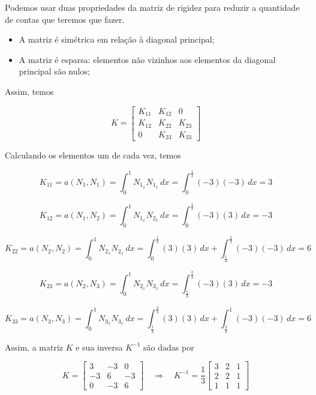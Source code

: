 \documentclass[12pt]{scrartcl}
\newcommand{\logo}{\quad \Rightarrow \quad}
\begin{document}
Podemos usar duas propriedades da matriz de rigidez para reduzir a quantidade de contas que teremos que fazer.
\begin{itemize}
    \item A matriz é simétrica em relação à diagonal principal;
    \item A matriz é esparsa: elementos não vizinhos aos elementos da diagonal principal são nulos;
\end{itemize}

Assim, temos

\begingroup
\renewcommand*{\arraystretch}{2}

\[
    K =
    \begin{bmatrix}
        K_{11} & K_{12} & 0      \\
        K_{12} & K_{22} & K_{23} \\
        0      & K_{23} & K_{33}
    \end{bmatrix}
\]

\endgroup

Calculando os elementos um de cada vez, temos

\[
    K_{11} = a\left(N_1, N_1\right) = \int_{0}^{1} N_{1_x} N_{1_x} \, dx = \int_{0}^{\frac{1}{3}} (-3) (-3) \, dx = 3
\]

\[
    K_{12} = a\left(N_1, N_2\right) = \int_{0}^{1} N_{1_x} N_{2_x} \, dx = \int_{0}^{\frac{1}{3}} (-3) (3) \, dx = - 3
\]

\[
    K_{22} = a\left(N_2, N_2\right) = \int_{0}^{1} N_{2_x} N_{2_x} \, dx =
    \int_{0}^{\frac{1}{3}} (3) (3) \, dx + \int_{\frac{1}{3}}^{\frac{2}{3}} (-3) (-3) \, dx  = 6
\]

\[
    K_{23} = a\left(N_2, N_3\right) = \int_{0}^{1} N_{2_x} N_{3_x} \, dx =
    \int_{\frac{1}{3}}^{\frac{2}{3}} (-3) (3) \, dx  = -3
\]

\[
    K_{33} = a\left(N_3, N_3\right) = \int_{0}^{1} N_{3_x} N_{3_x} \, dx =
    \int_{\frac{1}{3}}^{\frac{2}{3}} (3) (3) \, dx + \int_{\frac{2}{3}}^{1} (-3) (-3) \, dx  = 6
\]

Assim, a matriz $K$ e sua inversa $K^{-1}$ são dadas por

\begingroup
\renewcommand*{\arraystretch}{2}

\[
    K =
    \begin{bmatrix}
        3  & -3 & 0  \\
        -3 & 6  & -3 \\
        0  & -3 & 6
    \end{bmatrix}
    \logo K^{-1} = \frac{1}{3}
    \begin{bmatrix}
        3 & 2 & 1 \\
        2 & 2 & 1 \\
        1 & 1 & 1
    \end{bmatrix}
\]
\end{document}
